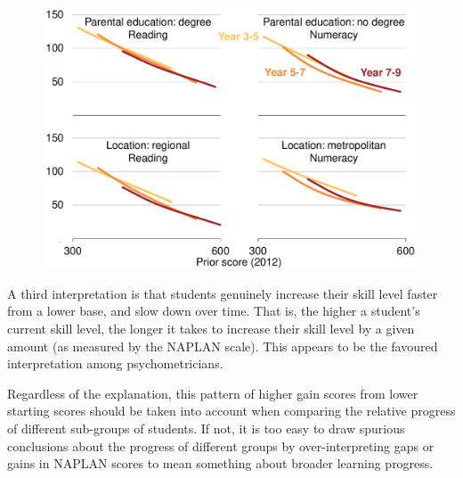 \begin{figure}[t]
 \includegraphics[width=\columnwidth]{atlas/Gain_prior.pdf}\label{fig:gain_prior}

\end{figure}

A third interpretation is that students genuinely increase their skill level faster from a lower base, and slow down over time. That is, the higher a student's current skill level, the longer it takes to increase their skill level by a given amount (as measured by the NAPLAN scale). This appears to be the favoured interpretation among psychometricians.

Regardless of the explanation, this pattern of higher gain scores from lower starting scores should be taken into account when comparing the relative progress of different sub-groups of students. If not, it is too easy to draw spurious conclusions about the progress of different groups by over-interpreting gaps or gains in NAPLAN scores to mean something about broader learning progress.


